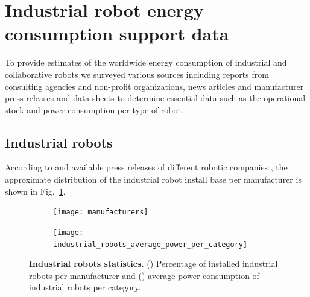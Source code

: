 \section{Industrial robot energy consumption support data}\label{sec:app_robot_ener_consumption}
To provide estimates of the worldwide energy consumption of industrial and collaborative robots we surveyed various sources including reports from consulting agencies and non-profit organizations, news articles and manufacturer press releases and data-sheets to determine essential data such as the operational stock and power consumption per type of robot.

\subsection{Industrial robots}
According to \cite{montaqim2015} and available press releases of different robotic companies \cite{fanuc2015, yaskawa2014, ABB2015}, the approximate distribution of the industrial robot install base per manufacturer is shown in Fig.~\ref{fig:manufacturers_pie}.
\begin{figure}[!h]
	\centering
	\hspace*{\fill}
	\begin{subfigure}[t]{0.45\textwidth}
		\subcaption{}
		\texttt{[image: manufacturers]}
		\label{fig:manufacturers_pie}
	\end{subfigure}
	\hfill
	\begin{subfigure}[t]{0.45\textwidth}
		\subcaption{}
		\texttt{[image: industrial\_robots\_average\_power\_per\_category]} \label{fig:ir_average_power}
	\end{subfigure}
	\hspace*{\fill}
	\caption[] {\label{fig:ir_statistics} \textbf{Industrial robots statistics.} () Percentage of installed industrial robots per manufacturer and () average power consumption of industrial robots per category.}
\end{figure}

